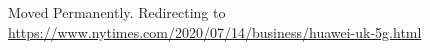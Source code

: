 Moved Permanently. Redirecting to
\url{https://www.nytimes.com/2020/07/14/business/huawei-uk-5g.html}
